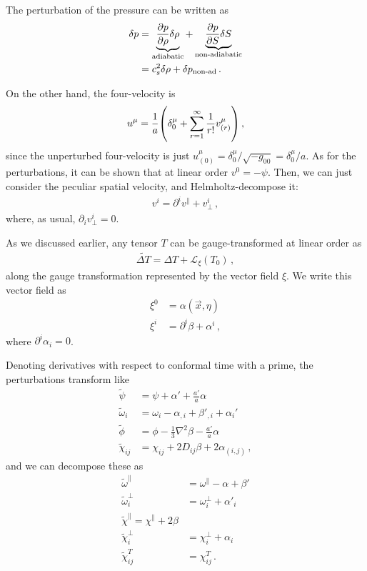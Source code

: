 \documentclass[main.tex]{subfiles}
\begin{document}
The perturbation of the pressure can be written as 
%
\begin{align}
\delta p &= \underbrace{\pdv{p}{\rho } \delta \rho }_{\text{adiabatic}} 
+ \underbrace{\pdv{p}{S} \delta S}_{\text{non-adiabatic}}  \\
&= c_s^2 \delta \rho + \delta p _{\text{non-ad}}
\,.
\end{align}

On the other hand, the four-velocity is 
%
\begin{align}
u^{\mu } = \frac{1}{a} \qty(\delta^{\mu }_{0} + \sum _{r=1}^{\infty } \frac{1}{r!} v^{\mu }_{(r)})
\,,
\end{align}
%
since the unperturbed four-velocity is just \(u^{\mu }_{(0)} = \delta^{\mu }_0  / \sqrt{- g_{00} } = \delta^{\mu }_{0} / a\).
As for the perturbations, it can be shown that at linear order \(v^{0} = - \psi \). 
Then, we can just consider the peculiar spatial velocity, and Helmholtz-decompose it: 
%
\begin{align}
v^{i} = \partial^{i} v^{\parallel} + v^{i}_\perp
\,,
\end{align}
%
where, as usual, \(\partial_{i} v^{i}_\perp = 0\). 

As we discussed earlier, any tensor \(T\) can be gauge-transformed at linear order as 
%
\begin{align}
\widetilde{\Delta T} = \Delta T + \mathscr{L}_\xi (T_0 )
\,,
\end{align}
%
along the gauge transformation represented by the vector field \(\xi \). 
We write this vector field as 
%
\begin{align}
\xi^{0} &= \alpha (\vec{x}, \eta )  \\
\xi^{i} &= \partial^{i} \beta + \alpha^{i}
\,,
\end{align}
%
where \(\partial^{i} \alpha _i = 0\). 

Denoting derivatives with respect to conformal time with a prime, the perturbations transform like 
%
\begin{align}
\widetilde{\psi} &= \psi + \alpha ' + \frac{a'}{a} \alpha   \\
\widetilde{\omega}_i &= \omega _i - \alpha_{, i} + \beta'_{, i} + \alpha _i'   \\ 
\widetilde{\phi} &= \phi - \frac{1}{3} \nabla^2 \beta - \frac{a'}{a} \alpha  \\
\widetilde{\chi}_{ij} &= \chi_{ij} + 2 D_{ij} \beta + 2\alpha_{(i, j)} 
\,,
\end{align}
%
and we can decompose these as 
%
\begin{align}
\widetilde{\omega}^{\parallel} &= \omega^{\parallel} - \alpha + \beta '  \\
\widetilde{\omega}^{\perp}_i &= \omega^{\perp}_i + \alpha'_i  \\
\widetilde{\chi}^{\parallel } = \chi^{\parallel} + 2 \beta   \\
\widetilde{\chi}^{\perp}_i &= \chi^{\perp}_i + \alpha _i  \\
\widetilde{\chi}^{T}_{ij} &= \chi^{T}_{ij}
\,.
\end{align}
\end{document}
